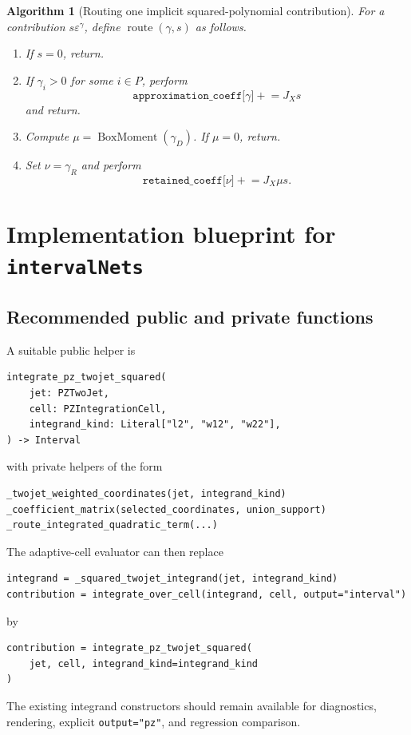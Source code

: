 \documentclass[11pt]{article}
\newtheorem{algorithmblock}{Algorithm}
\newcommand{\eps}{\varepsilon}
\begin{document}
\begin{algorithmblock}[Routing one implicit squared-polynomial contribution]
\label{alg:route}
For a contribution \(s\eps^\gamma\), define
\(\operatorname{route}(\gamma,s)\) as follows.
\begin{enumerate}[label=\arabic*.,leftmargin=1.8em]
    \item If \(s=0\), return.
    \item If \(\gamma_i>0\) for some \(i\in P\), perform
    \[
        \texttt{approximation\_coeff[\(\gamma\)]}
        \mathrel{+}=J_X s
    \]
    and return.
    \item Compute \(\mu=\operatorname{BoxMoment}(\gamma_D)\).  If
    \(\mu=0\), return.
    \item Set \(\nu=\gamma_R\) and perform
    \[
        \texttt{retained\_coeff[\(\nu\)]}
        \mathrel{+}=J_X\mu s.
    \]
\end{enumerate}
\end{algorithmblock}

\section{Implementation blueprint for \texttt{intervalNets}}
\label{sec:implementation}

\subsection{Recommended public and private functions}

A suitable public helper is
\begin{verbatim}
integrate_pz_twojet_squared(
    jet: PZTwoJet,
    cell: PZIntegrationCell,
    integrand_kind: Literal["l2", "w12", "w22"],
) -> Interval
\end{verbatim}
with private helpers of the form
\begin{verbatim}
_twojet_weighted_coordinates(jet, integrand_kind)
_coefficient_matrix(selected_coordinates, union_support)
_route_integrated_quadratic_term(...)
\end{verbatim}

The adaptive-cell evaluator can then replace
\begin{verbatim}
integrand = _squared_twojet_integrand(jet, integrand_kind)
contribution = integrate_over_cell(integrand, cell, output="interval")
\end{verbatim}
by
\begin{verbatim}
contribution = integrate_pz_twojet_squared(
    jet, cell, integrand_kind=integrand_kind
)
\end{verbatim}
The existing integrand constructors should remain available for diagnostics,
rendering, explicit \texttt{output="pz"}, and regression comparison.
\end{document}
